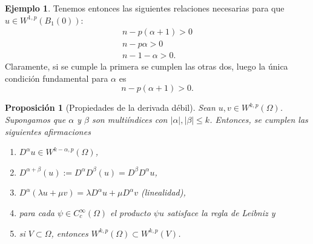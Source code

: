 \documentclass[12pt,a4paper]{book}
\newtheorem{prop}[thm]{Proposición}
\theoremstyle{definition} \newtheorem{defn}[thm]{Definición}
\theoremstyle{definition} \newtheorem{ejemplo}[thm]{Ejemplo}
\theoremstyle{definition} \newtheorem{ejercicio}[thm]{Ejercicio}
\theoremstyle{remark} \newtheorem*{obs}{Observación}
\begin{document}
\begin{ejemplo}
    Tenemos entonces las siguientes relaciones necesarias para que $u\in W^{1,p}(B_1(0))$:
    \begin{align*}
      n-p(\alpha+1)>0 \\
      n-p\alpha>0 \\
      n-1-\alpha>0.
    \end{align*}
    Claramente, si se cumple la primera se cumplen las otras dos, luego la única condición fundamental para $\alpha$ es
    \begin{equation*}
      n-p(\alpha+1)>0.
    \end{equation*}
  \end{ejemplo}
  \begin{prop}[Propiedades de la derivada débil]
    Sean $u,v \in W^{k,p}(\Omega)$. Supongamos que $\alpha$ y $\beta$ son multiíndices con $|\alpha|,|\beta| \leq k$. Entonces, se cumplen las siguientes afirmaciones
    \begin{enumerate}
      \item $D^\alpha u \in W^{k-\alpha,p}(\Omega)$,
      \item $D^{\alpha+\beta}(u):=D^{\alpha}D^{\beta}(u)=D^{\beta}D^{\alpha}u$,
      \item  $D^{\alpha}(\lambda u + \mu v)=\lambda D^{\alpha} u + \mu D^\alpha v$ (linealidad),
      \item para cada $\psi \in C^{\infty}_c(\Omega)$ el producto $\psi u$ satisface la regla de Leibniz y
      \item si $V\subset \Omega$, entonces $W^{k,p}(\Omega)\subset W^{k,p}(V)$.
    \end{enumerate}
  \end{prop}
\end{document}
